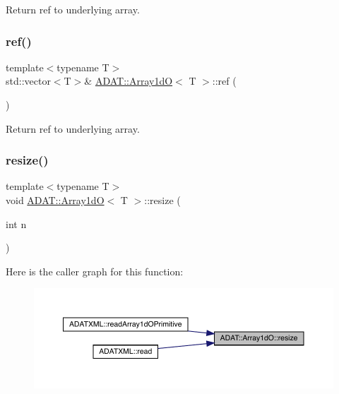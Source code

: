 Return ref to underlying array. 

\mbox{\label{classADAT_1_1Array1dO_ac3ff9b35bef8e7fa276136673b907749}} 
\subsubsection{\texorpdfstring{ref()}{ref()}\hspace{0.1cm}{\footnotesize\ttfamily [6/6]}}
{\footnotesize\ttfamily template$<$typename T$>$ \\
std\+::vector$<$T$>$\& \mbox{\hyperlink{classADAT_1_1Array1dO}{A\+D\+A\+T\+::\+Array1dO}}$<$ T $>$\+::ref (\begin{DoxyParamCaption}{ }\end{DoxyParamCaption})\hspace{0.3cm}{\ttfamily [inline]}}



Return ref to underlying array. 

\mbox{\label{classADAT_1_1Array1dO_afc98b7076e43428faae90d7cb1dab3bf}} 
\subsubsection{\texorpdfstring{resize()}{resize()}\hspace{0.1cm}{\footnotesize\ttfamily [1/3]}}
{\footnotesize\ttfamily template$<$typename T$>$ \\
void \mbox{\hyperlink{classADAT_1_1Array1dO}{A\+D\+A\+T\+::\+Array1dO}}$<$ T $>$\+::resize (\begin{DoxyParamCaption}\item[{int}]{n }\end{DoxyParamCaption})\hspace{0.3cm}{\ttfamily [inline]}}

Here is the caller graph for this function\+:
\nopagebreak
\begin{figure}[H]
\begin{center}
\leavevmode
\includegraphics[width=350pt]{db/d5c/classADAT_1_1Array1dO_afc98b7076e43428faae90d7cb1dab3bf_icgraph}
\end{center}
\end{figure}
\mbox{\label{classADAT_1_1Array1dO_afc98b7076e43428faae90d7cb1dab3bf}} 
